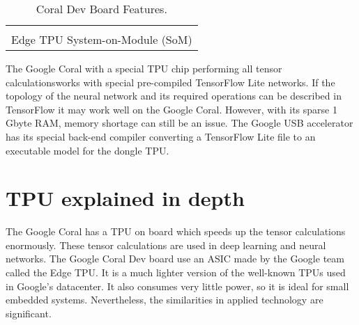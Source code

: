 \begin{table}[htb]
	\centering
	\begin{tabular}{c}
	\hline \\
Edge TPU System-on-Module (SoM)\\
\hline
	\end{tabular}
	\caption{Coral Dev Board Features.}
	\label{tab:hard-devboard-spec}
\end{table}
%
\noindent The Google Coral with a special TPU chip
performing all tensor calculationsworks with special 
pre-compiled TensorFlow Lite networks. If the topology of the neural network and
its required operations can be described in TensorFlow it may work well on the
Google Coral. However, with its sparse 1 Gbyte RAM, memory shortage can still be
an issue. The Google USB accelerator has its special back-end compiler
converting a TensorFlow Lite file to an executable model for the dongle
TPU.
% 
%
\section{TPU explained in depth}
\label{sec:hard-tpu}
The Google Coral has a TPU on board which speeds up the tensor calculations
enormously. These tensor calculations are used in deep learning and neural
networks. \hfill \break 
The Google Coral Dev board use an ASIC made by the Google team called the Edge 
TPU.  It is a much lighter version of the well-known TPUs used in Google's 
datacenter. \hfill \break
It also consumes very little power, so it is ideal for small embedded systems. 
Nevertheless, the similarities in applied technology are significant.\cite{TPU:explained} 
%

